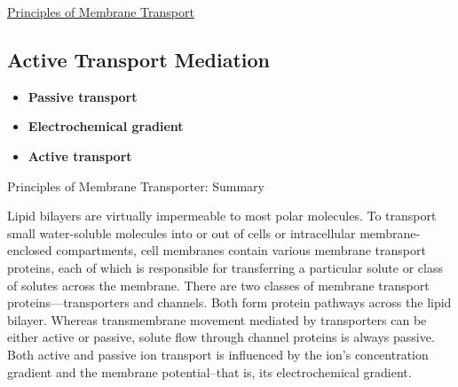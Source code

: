 \documentclass[12pt,letterpaper]{article}
\begin{document}
\begin{secbox}{\hyperlink{11}{Principles of Membrane Transport}}
{    \hypertarget{11.1.2}{\subsection*{Active Transport Mediation}}
    \begin{itemize}
        \item \textbf{Passive transport}
        \item \textbf{Electrochemical gradient}
        \item \textbf{Active transport}
    \end{itemize} 
    \vspace{6pt}
    \hypertarget{11.1.r}{}
    \begin{probbox}{Principles of Membrane Transporter: Summary}\end{probbox}
    \vspace{18pt}
        Lipid bilayers are virtually impermeable to most polar molecules. To transport small water-soluble molecules into or out of cells or intracellular membrane-enclosed compartments, cell membranes contain various membrane transport proteins, each of which is responsible for transferring a particular solute or class of solutes across the membrane. There are two classes of membrane transport proteins—transporters and channels. Both form protein pathways across the lipid bilayer. Whereas transmembrane movement mediated by transporters can be either active or passive, solute flow through channel proteins is always passive. Both active and passive ion transport is influenced by the ion’s concentration gradient and the membrane potential--that is, its electrochemical gradient.
}\end{secbox}
\end{document}
